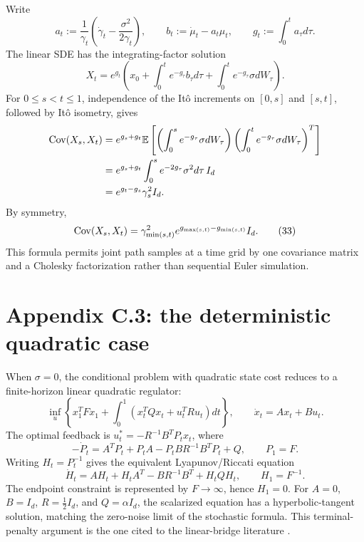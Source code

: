 Write
\[
  a_t:=\frac1{\gamma_t}
  \left(\dot\gamma_t-\frac{\sigma^2}{2\gamma_t}\right),
  \qquad
  b_t:=\dot\mu_t-a_t\mu_t,
  \qquad
  g_t:=\int_0^t a_\tau d\tau.
\]
The linear SDE has the integrating-factor solution
\begin{equation}
  X_t=e^{g_t}
  \left(
    x_0+\int_0^t e^{-g_\tau}b_\tau d\tau
    +\int_0^t e^{-g_\tau}\sigma dW_\tau
  \right).
  \tag{32}\label{eq:gsbm-linear-solution}
\end{equation}
For $0\le s<t\le1$, independence of the It\^o increments on $[0,s]$ and
$[s,t]$, followed by It\^o isometry, gives
\begin{align*}
  \operatorname{Cov}(X_s,X_t)
  &=e^{g_s+g_t}
    \mathbb{E}\left[
      \left(\int_0^s e^{-g_\tau}\sigma dW_\tau\right)
      \left(\int_0^t e^{-g_\tau}\sigma dW_\tau\right)^T
    \right]\\
  &=e^{g_s+g_t}\int_0^s e^{-2g_\tau}\sigma^2d\tau\,I_d\\
  &=e^{g_t-g_s}\gamma_s^2I_d.
\end{align*}
By symmetry,
\begin{equation}
  \operatorname{Cov}(X_s,X_t)
  =\gamma_{\min(s,t)}^2
   e^{g_{\max(s,t)}-g_{\min(s,t)}}I_d.
  \tag{33}\label{eq:gsbm-covariance}
\end{equation}
This formula permits joint path samples at a time grid by one covariance matrix
and a Cholesky factorization rather than sequential Euler simulation.

\section{Appendix C.3: the deterministic quadratic case}
When $\sigma=0$, the conditional problem with quadratic state cost reduces to a
finite-horizon linear quadratic regulator:
\begin{equation}
  \inf_u\left
  \{x_1^TFx_1+
  \int_0^1(x_t^TQx_t+u_t^TRu_t)dt\right\},
  \qquad
  \dot x_t=Ax_t+Bu_t.
  \tag{34}\label{eq:gsbm-lqr}
\end{equation}
The optimal feedback is $u_t^*=-R^{-1}B^TP_tx_t$, where
\[
  -\dot P_t=A^TP_t+P_tA-P_tBR^{-1}B^TP_t+Q,
  \qquad P_1=F.
\]
Writing $H_t=P_t^{-1}$ gives the equivalent Lyapunov/Riccati equation
\begin{equation}
  \dot H_t=AH_t+H_tA^T-BR^{-1}B^T+H_tQH_t,
  \qquad H_1=F^{-1}.
  \tag{35}\label{eq:gsbm-inverse-riccati}
\end{equation}
The endpoint constraint is represented by $F\to\infty$, hence $H_1=0$.  For
$A=0$, $B=I_d$, $R=\frac12I_d$, and $Q=\alpha I_d$, the scalarized equation
has a hyperbolic-tangent solution, matching the zero-noise limit of the
stochastic formula.  This terminal-penalty argument is the one cited to the
linear-bridge literature \cite{ChenGeorgiou2015LinearBridges}.

